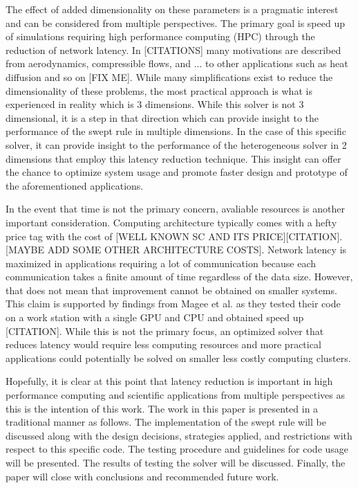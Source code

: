 \documentclass[review]{elsarticle}
\begin{document}
\par
The effect of added dimensionality on these parameters is a pragmatic interest and can be considered from multiple perspectives. The primary goal is speed up of simulations requiring high performance computing (HPC) through the reduction of network latency. In [CITATIONS] many motivations are described from aerodynamics, compressible flows, and ... to other applications such as heat diffusion and so on [FIX ME]. While many simplifications exist to reduce the dimensionality of these problems, the most practical approach is what is experienced in reality which is 3 dimensions. While this solver is not 3 dimensional, it is a step in that direction which can provide insight to the performance of the swept rule in multiple dimensions. In the case of this specific solver, it can provide insight to the performance of the heterogeneous solver in 2 dimensions that employ this latency reduction technique. This insight can offer the chance to optimize system usage and promote faster design and prototype of the aforementioned applications.

\par
In the event that time is not the primary concern, avaliable resources is another important consideration. Computing architecture typically comes with a hefty price tag with the cost of [WELL KNOWN SC AND ITS PRICE][CITATION]. [MAYBE ADD SOME OTHER ARCHITECTURE COSTS]. Network latency is maximized in applications requiring a lot of communication because each communication takes a finite amount of time regardless of the data size. However, that does not mean that improvement cannot be obtained on smaller systems. This claim is supported by findings from Magee et al. as they tested their code on a work station with a single GPU and CPU and obtained speed up [CITATION]. While this is not the primary focus, an optimized solver that reduces latency would require less computing resources and more practical applications could potentially be solved on smaller less costly computing clusters.

\par
Hopefully, it is clear at this point that latency reduction is important in high performance computing and scientific applications from multiple perspectives as this is the intention of this work. The work in this paper is presented in a traditional manner as follows. The implementation of the swept rule will be discussed along with the design decisions, strategies applied, and restrictions with respect to this specific code. The testing procedure and guidelines for code usage will be presented. The results of testing the solver will be discussed. Finally, the paper will close with conclusions and recommended future work.
\end{document}
